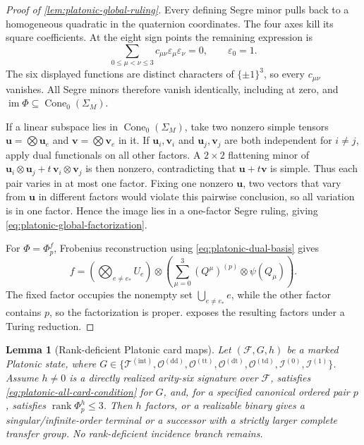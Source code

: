 \documentclass[11pt,letterpaper,onecolumn]{article}
\theoremstyle{plain}
\newtheorem{lemma}[lemma]{Lemma}
\theoremstyle{definition}
\theoremstyle{remark}
\newcommand{\cF}{\mathcal F}
\newcommand{\TetInt}{{\mathcal T^{(\mathrm{int})}}}
\newcommand{\OctDD}{{\mathcal O^{(\mathrm{dd})}}}
\newcommand{\OctTT}{{\mathcal O^{(\mathrm{tt})}}}
\newcommand{\OctDT}{{\mathcal O^{(\mathrm{dt})}}}
\newcommand{\OctTD}{{\mathcal O^{(\mathrm{td})}}}
\newcommand{\IcoZero}{{\mathcal I^{(0)}}}
\newcommand{\IcoOne}{{\mathcal I^{(1)}}}
\newcommand{\rank}{\operatorname{rank}}
\newcommand{\eps}{\varepsilon}
\begin{document}
\begin{proof}[Proof of \cref{lem:platonic-global-ruling}]
Every defining Segre minor pulls back to a homogeneous quadratic in the
quaternion coordinates.  The four axes kill its square coefficients. At the
eight sign points the remaining expression is
\[
 \sum_{0\le\mu<\nu\le3}c_{\mu\nu}\eps_\mu\eps_\nu=0,
 \qquad \eps_0=1.
\]
The six displayed functions are distinct characters of
\(\{\pm1\}^3\), so every \(c_{\mu\nu}\) vanishes.  All Segre minors
therefore vanish identically, including at zero, and
\(\operatorname{im}\Phi\subseteq\operatorname{Cone}_0(\Sigma_M)\).

If a linear subspace lies in \(\operatorname{Cone}_0(\Sigma_M)\), take two nonzero simple tensors
\({\mathbf{u}}=\bigotimes {\mathbf{u}}_e\) and \({\mathbf{v}}=\bigotimes {\mathbf{v}}_e\) in it.  If \({\mathbf{u}}_i,{\mathbf{v}}_i\) and
\({\mathbf{u}}_j,{\mathbf{v}}_j\) are both independent for \(i\ne j\), apply dual functionals on
all other factors. A \(2\times2\) flattening minor of
\({\mathbf{u}}_i\otimes {\mathbf{u}}_j+t\,{\mathbf{v}}_i\otimes {\mathbf{v}}_j\) is then nonzero, contradicting that
\({\mathbf{u}}+t{\mathbf{v}}\) is simple.  Thus each pair varies in at most one factor.  Fixing
one nonzero \({\mathbf{u}}\), two vectors that vary from \({\mathbf{u}}\) in different factors
would violate this pairwise conclusion, so all variation is in one factor.
Hence the image lies in a one-factor Segre ruling, giving
\cref{eq:platonic-global-factorization}.

For \(\Phi=\Phi_p^f\), Frobenius reconstruction using
\cref{eq:platonic-dual-basis} gives
\[
 f=
 \left(\bigotimes_{e\ne e_*}U_e\right)
 \otimes
 \left(\sum_{\mu=0}^3(Q^\mu)^{(p)}\otimes\psi(Q_\mu)\right).
\]
The fixed factor occupies the nonempty set
\(\bigcup_{e\ne e_*}e\), while the other factor contains \(p\), so the
factorization is proper.   exposes the resulting factors under a
Turing reduction.
\end{proof}

\begin{lemma}[Rank-deficient Platonic card maps]
\label{lem:platonic-deficient-rank}
Let \((\cF,G,h)\) be a marked Platonic state, where
\(G\in\{\TetInt,\OctDD,\OctTT,\OctDT,
\OctTD,\IcoZero,\IcoOne\}\).
Assume \(h\ne0\) is a directly realized arity-six signature over \(\cF\), satisfies \cref{eq:platonic-all-card-condition}
for \(G\), and, for a specified canonical ordered pair \(p\), satisfies
\(\rank\Phi_p^h\le3\).  Then \(h\)
factors, or a realizable binary gives a singular/infinite-order terminal or
a successor with a strictly larger complete transfer group.  No rank-deficient incidence branch remains.
\end{lemma}
\end{document}
